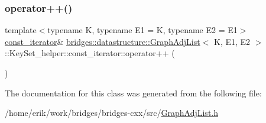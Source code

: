 \subsubsection{\texorpdfstring{operator++()}{operator++()}}
{\footnotesize\ttfamily template$<$typename K, typename E1 = K, typename E2 = E1$>$ \\
\hyperlink{classbridges_1_1datastructure_1_1_graph_adj_list_1_1_key_set__helper_1_1const__iterator}{const\+\_\+iterator}\& \hyperlink{classbridges_1_1datastructure_1_1_graph_adj_list}{bridges\+::datastructure\+::\+Graph\+Adj\+List}$<$ K, E1, E2 $>$\+::Key\+Set\+\_\+helper\+::const\+\_\+iterator\+::operator++ (\begin{DoxyParamCaption}{ }\end{DoxyParamCaption})\hspace{0.3cm}{\ttfamily [inline]}}



The documentation for this class was generated from the following file\+:\begin{DoxyCompactItemize}
\item 
/home/erik/work/bridges/bridges-\/cxx/src/\hyperlink{_graph_adj_list_8h}{Graph\+Adj\+List.\+h}\end{DoxyCompactItemize}
